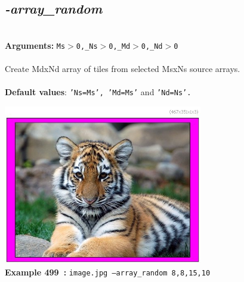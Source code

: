\documentclass[a4paper,11pt,twoside]{book}
\begin{document}
\subsection{\emph{-array\_random} }\vspace*{-0.5em}
~\\\textbf{Arguments: } 
{\small \texttt{Ms$>$0,\_Ns$>$0,\_Md$>$0,\_Nd$>$0}}\\~\\
Create MdxNd array of tiles from selected MsxNs source arrays.
~\\~\\\textbf{Default values}: {\small \texttt{'Ns=Ms', 'Md=Ms'} and \texttt{'Nd=Ns'.}}
\begin{center}\includegraphics[keepaspectratio=true,height=7cm,width=\textwidth]{img/gmic_def499.jpg}\\
{\footnotesize \textbf{Example 499~:} \texttt{image.jpg --array\_random 8,8,15,10}}
\end{center}
\end{document}
